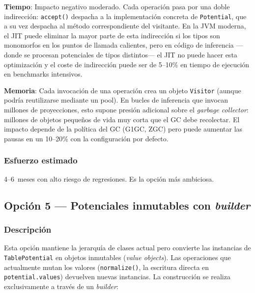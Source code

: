 \documentclass[11pt,a4paper]{article}
\newcommand{\code}[1]{\texttt{#1}}
\begin{document}
\textbf{Tiempo}: Impacto negativo moderado.  Cada operación pasa por una doble
indirección: \code{accept()} despacha a la implementación concreta de
\code{Potential}, que a su vez despacha al método correspondiente del visitante.
En la JVM moderna, el JIT puede eliminar la mayor parte de esta indirección si
los tipos son monomorfos en los puntos de llamada calientes, pero en código de
inferencia ---donde se procesan potenciales de tipos distintos--- el JIT no puede
hacer esta optimización y el coste de indirección puede ser de
5--10\% en tiempo de ejecución en benchmarks intensivos.

\textbf{Memoria}: Cada invocación de una operación crea un objeto \code{Visitor}
(aunque podría reutilizarse mediante un pool).  En bucles de inferencia que
invocan millones de proyecciones, esto supone presión adicional sobre el
\emph{garbage collector}: millones de objetos pequeños de vida muy corta que el
GC debe recolectar.  El impacto depende de la política del GC (G1GC, ZGC) pero
puede aumentar las pausas en un 10--20\% con la configuración por defecto.

\subsubsection*{Esfuerzo estimado}

4--6~meses con alto riesgo de regresiones.  Es la opción más ambiciosa.

\subsection{Opción 5 --- Potenciales inmutables con \emph{builder}}
\label{sec:op5}

\subsubsection*{Descripción}

Esta opción mantiene la jerarquía de clases actual pero convierte las instancias
de \code{TablePotential} en objetos inmutables (\emph{value objects}).  Las
operaciones que actualmente mutan los valores (\code{normalize()}, la escritura
directa en \code{potential.values}) devuelven nuevas instancias.  La construcción
se realiza exclusivamente a través de un \emph{builder}:
\end{document}
